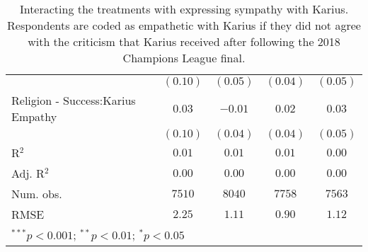 \begin{table}[H]
\begin{center}
\begin{footnotesize}
\begin{tabular}{l c c c c}
                                   & $(0.10)$ & $(0.05)$     & $(0.04)$     & $(0.05)$     \\
Religion - Success:Karius Empathy  & $0.03$   & $-0.01$      & $0.02$       & $0.03$       \\
                                   & $(0.10)$ & $(0.04)$     & $(0.04)$     & $(0.05)$     \\
\hline
R$^2$                              & $0.01$   & $0.01$       & $0.01$       & $0.00$       \\
Adj. R$^2$                         & $0.00$   & $0.00$       & $0.00$       & $0.00$       \\
Num. obs.                          & $7510$   & $8040$       & $7758$       & $7563$       \\
RMSE                               & $2.25$   & $1.11$       & $0.90$       & $1.12$       \\
\hline
\multicolumn{5}{l}{\tiny{$^{***}p<0.001$; $^{**}p<0.01$; $^{*}p<0.05$}}
\end{tabular}
\end{footnotesize}
\caption{Interacting the treatments with expressing sympathy with Karius. Respondents are coded as empathetic 
       with Karius if they did not agree with the criticism that Karius received after following the 2018 Champions 
       League final.}
\label{tab:ate_karius}
\end{center}
\end{table}
